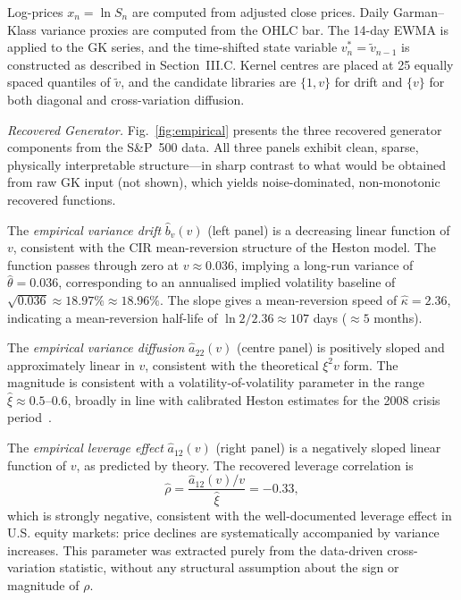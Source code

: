 \documentclass[reprint, amsmath, amssymb, aps, prl, superscriptaddress, nofootinbib]{revtex4-2}
\begin{document}
Log-prices $x_n = \ln S_n$ are computed from adjusted close prices. Daily
Garman--Klass variance proxies are computed from the OHLC bar. The 14-day
EWMA is applied to the GK series, and the time-shifted state variable
$v_n^* = \widetilde{v}_{n-1}$ is constructed as described in Section~III.C.
Kernel centres are placed at 25 equally spaced quantiles of $\widetilde{v}$,
and the candidate libraries are $\{1, v\}$ for drift and $\{v\}$ for both
diagonal and cross-variation diffusion.

\textit{Recovered Generator.}
Fig.~\ref{fig:empirical} presents the three recovered generator components
from the S\&P~500 data. All three panels exhibit clean, sparse, physically
interpretable structure---in sharp contrast to what would be obtained from raw
GK input (not shown), which yields noise-dominated, non-monotonic recovered
functions.

The \emph{empirical variance drift} $\hat{b}_v(v)$ (left panel) is a
decreasing linear function of $v$, consistent with the CIR mean-reversion
structure of the Heston model. The function passes through zero at $v \approx
0.036$, implying a long-run variance of $\hat\theta = 0.036$, corresponding
to an annualised implied volatility baseline of
$\sqrt{0.036} \approx 18.97\% \approx 18.96\%$. The slope gives a
mean-reversion speed of $\hat\kappa = 2.36$, indicating a mean-reversion
half-life of $\ln 2 / 2.36 \approx 107$ days ($\approx 5$ months).

The \emph{empirical variance diffusion} $\hat{a}_{22}(v)$ (centre panel)
is positively sloped and approximately linear in $v$, consistent with the
theoretical $\xi^2 v$ form. The magnitude is consistent with a
volatility-of-volatility parameter in the range $\hat\xi \approx 0.5$--$0.6$,
broadly in line with calibrated Heston estimates for the 2008 crisis period~\cite{GatheralJacquier2014}.

The \emph{empirical leverage effect} $\hat{a}_{12}(v)$ (right panel) is a
negatively sloped linear function of $v$, as predicted by theory. The recovered
leverage correlation is
\begin{equation}
  \hat\rho = \frac{\hat{a}_{12}(v) / v}{\hat\xi} = -0.33,
\end{equation}
which is strongly negative, consistent with the well-documented leverage effect
in U.S. equity markets: price declines are systematically accompanied by variance
increases. This parameter was extracted purely from the data-driven cross-variation
statistic, without any structural assumption about the sign or magnitude of $\rho$.
\end{document}
